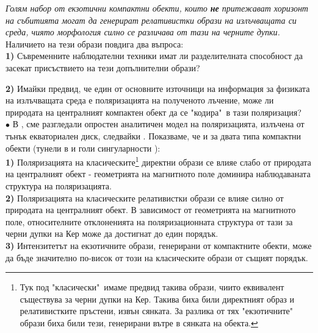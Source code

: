 \documentclass[12pt]{article}
\numberwithin{equation}{section}
\numberwithin{figure}{section}
\begin{document}
	\emph{Голям набор от екзотични компактни обекти, които \textbf{не} притежават хоризонт на събитията могат да генерират релативистки образи на излъчващата си среда, чиято морфология силно се различава от тази на черните дупки.}\\
	
	\noindent Наличието на тези образи повдига два въпроса:\\
	
	\noindent\textbf{1)} Съвременните наблюдателни техники имат ли разделителната способност да засекат присъствието на тези допълнителни образи?\newline
	
	\noindent\textbf{2)} Имайки предвид, че един от основните източници на информация за физиката на излъчващата среда е поляризацията на полученото лъчение, може ли природата на централният компактен обект да се "кодира"$\,$ в тази поляризация?\\\newline
	$\bullet$ В \cite{Delijski2022}, \cite{Deliyski2023} сме разгледали опростен аналитичен модел на поляризацията, излъчена от тънък екваториален диск, следвайки \cite{Narayan2021}. Показваме, че и за двата типа компактни обекти (тунели в \cite{Delijski2022} и голи сингуларности \cite{Deliyski2023}):\\\newline
	\textbf{1)} Поляризацията на класическите\footnote{Тук под "класически"$\,$ имаме предвид такива образи, чиито еквивалент съществува за черни дупки на Кер. Такива биха били директният образ и релативистките пръстени, извън сянката. За разлика от тях "екзотичните"$\,$ образи биха били тези, генерирани вътре в сянката на обекта.} директни образи се влияе слабо от природата на централният обект - геометрията на магнитното поле доминира наблюдаваната структура на поляризацията.\\\newline
	\textbf{2)} Поляризацията на класическите релативистки образи се влияе силно от природата на централният обект. В зависимост от геометрията на магнитното поле, относителните отклоненията на поляризационната структура от тази за черни дупки на Кер може да достигнат 
	до един порядък.\\\newline
	\textbf{3)} Интензитетът на екзотичните образи, генерирани от компактните обекти, може да бъде значително по-висок от този на класическите образи от същият порядък.\\
	
\end{document}
